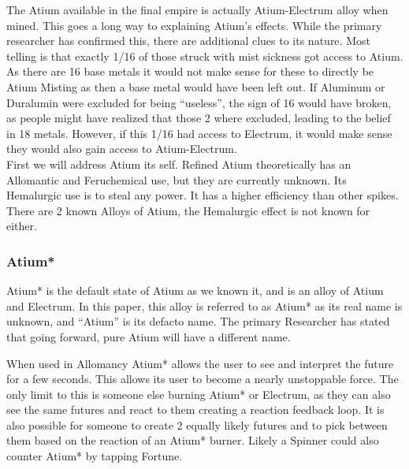 \documentclass[conference]{IEEEtran}
\begin{document}
The Atium available in the final empire\cite{TFE-CH13} is actually Atium-Electrum alloy when mined.\cite{atium-electrum}  This goes a long way to explaining Atium's effects.  While the primary researcher has confirmed this, there are additional clues to its nature.  Most telling is that exactly 1/16 of those struck with mist sickness got access to Atium.\cite{HoA-CH70}  As there are 16 base metals it would not make sense for these to directly be Atium Misting as then a base metal would have been left out.  If Aluminum or Duralumin were excluded for being ``useless'', the sign of 16 would have broken, as people might have realized that those 2 where excluded, leading to the belief in 18 metals.  However, if this 1/16 had access to Electrum, it would make sense they would also gain access to Atium-Electrum.\\

First we will address Atium its self.  Refined Atium theoretically has an Allomantic and Feruchemical use, but they are currently unknown.  Its Hemalurgic use is to steal any power.\cite{HE-TB}  It has a higher efficiency than other spikes.\cite{atium-efficency}\\

There are 2 known Alloys of Atium, the Hemalurgic effect is not known for either.\\

\subsubsection*{\textbf{Atium*}}\hfill\break\indent Atium* is the default state of Atium as we known it, and is an alloy of Atium and Electrum.\cite{atium-electrum}  In this paper, this alloy is referred to as Atium* as its real name is unknown, and ``Atium'' is its defacto name.  The primary Researcher has stated that going forward, pure Atium will have a different name.\cite{Atium-pu-name}

When used in Allomancy Atium* allows the user to see and interpret the future for a few seconds.  This allows its user to become a nearly unstoppable force.\cite{TFE-CH14}  The only limit to this is someone else burning Atium*\cite{TFE-CH13} or Electrum,\cite{HoA-CH3} as they can also see the same futures and react to them creating a reaction feedback loop.  It is also possible for someone to create 2 equally likely futures and to pick between them based on the reaction of an Atium* burner.\cite{WoA-CH47}  Likely a Spinner could also counter Atium* by tapping Fortune.\\
\end{document}
